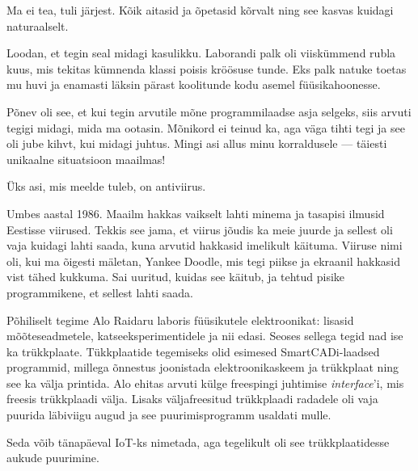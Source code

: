
Ma ei tea, tuli järjest. Kõik aitasid ja õpetasid kõrvalt ning see kasvas kuidagi 
naturaalselt.

Loodan, et tegin seal midagi kasulikku. Laborandi palk oli viiskümmend 
rubla kuus, mis tekitas kümnenda klassi poisis kröösuse tunde. Eks 
palk natuke toetas mu huvi ja 
enamasti läksin pärast koolitunde kodu asemel füüsikahoonesse.


Põnev oli see, et kui tegin arvutile mõne programmilaadse asja 
selgeks, siis arvuti tegigi midagi, mida ma ootasin. 
Mõnikord ei teinud ka, aga väga tihti tegi ja see oli jube kihvt, kui midagi 
juhtus. Mingi asi allus minu korraldusele --- täiesti unikaalne situatsioon 
maailmas!


Üks asi, mis meelde tuleb, on antiviirus. 


Umbes aastal 1986. Maailm hakkas vaikselt lahti minema ja 
tasapisi ilmusid Eestisse viirused. Tekkis see jama, et viirus jõudis ka
meie juurde ja sellest oli vaja kuidagi lahti saada, kuna arvutid hakkasid 
imelikult käituma. Viiruse nimi oli, kui ma õigesti mäletan, Yankee 
Doodle, mis tegi piikse ja ekraanil 
hakkasid vist tähed kukkuma. Sai uuritud, kuidas see käitub, ja tehtud pisike 
programmikene, et sellest lahti saada.

Põhiliselt tegime Alo Raidaru laboris füüsikutele
elektroonikat: lisasid mõõteseadmetele, 
katseeksperimentidele ja nii edasi. Seoses sellega tegid nad ise ka trükkplaate. 
Tükkplaatide tegemiseks olid esimesed SmartCADi-laadsed programmid, millega 
õnnestus joonistada elektroonikaskeem ja trükkplaat ning see ka välja 
printida. Alo ehitas arvuti külge freespingi juhtimise \emph{interface}'i, mis 
freesis trükkplaadi välja. Lisaks väljafreesitud trükkplaadi 
radadele oli vaja puurida läbiviigu augud ja see 
puurimisprogramm usaldati mulle.


Seda võib tänapäeval IoT-ks nimetada, aga tegelikult oli see trükkplaatidesse 
aukude puurimine. 

